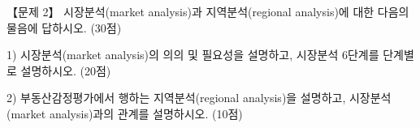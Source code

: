 \begin{longquestion}{【문제 2】}
시장분석(market analysis)과 지역분석(regional analysis)에 대한 다음의 물음에 답하시오. (30점) \par
1) 시장분석(market analysis)의 의의 및 필요성을 설명하고, 시장분석 6단계를 단계별로 설명하시오. (20점) \par
2) 부동산감정평가에서 행하는 지역분석(regional analysis)을 설명하고, 시장분석(market analysis)과의 관계를 설명하시오. (10점) \par
\end{longquestion}
